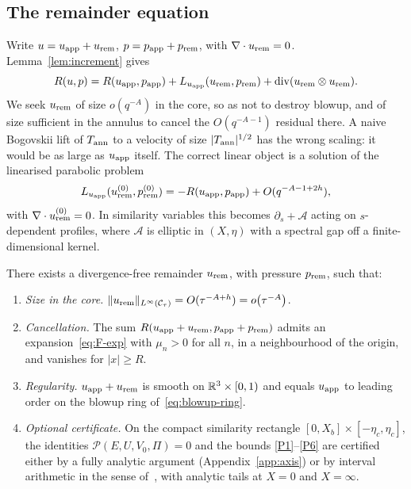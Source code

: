 \subsection{The remainder equation}

Write $u=u_{\mathrm{app}}+u_{\mathrm{rem}}$, $p=p_{\mathrm{app}}+p_{\mathrm{rem}}$, with $\nabla\cdot u_{\mathrm{rem}}=0$. Lemma~\ref{lem:increment} gives
\begin{equation}
\label{eq:rem-eq}
R(u,p)
=R(u_{\mathrm{app}},p_{\mathrm{app}})
+L_{u_{\mathrm{app}}}(u_{\mathrm{rem}},p_{\mathrm{rem}})
+\operatorname{div}(u_{\mathrm{rem}}\otimes u_{\mathrm{rem}}).
\end{equation}
We seek $u_{\mathrm{rem}}$ of size $o(q^{-A})$ in the core, so as not to destroy blowup, and of size sufficient in the annulus to cancel the $O(q^{-A-1})$ residual there. A naive {B}ogovskii lift of $T_{\mathrm{ann}}$ to a velocity of size $|T_{\mathrm{ann}}|^{1/2}$ has the wrong scaling: it would be as large as $u_{\mathrm{app}}$ itself. The correct linear object is a solution of the linearised parabolic problem
\[
L_{u_{\mathrm{app}}}(u_{\mathrm{rem}}^{(0)},p_{\mathrm{rem}}^{(0)})
=-R(u_{\mathrm{app}},p_{\mathrm{app}})+O(q^{-A-1+2h}),
\]
with $\nabla\cdot u_{\mathrm{rem}}^{(0)}=0$. In similarity variables this becomes $\partial_s+\mathcal A$ acting on $s$-dependent profiles, where $\mathcal A$ is elliptic in $(X,\eta)$ with a spectral gap off a finite-dimensional kernel.

\begin{assumption}
\label{ass:profile-control}
There exists a divergence-free remainder $u_{\mathrm{rem}}$, with pressure $p_{\mathrm{rem}}$, such that:
\begin{enumerate}[label=\textup{(B\arabic*)}]
\item \label{B1} \emph{Size in the core.} $\|u_{\mathrm{rem}}\|_{L^\infty(\mathcal C_\tau)}=O(\tau^{-A+h})=o\bigl(\tau^{-A}\bigr)$.
\item \label{B2} \emph{Cancellation.} The sum $R(u_{\mathrm{app}}+u_{\mathrm{rem}},p_{\mathrm{app}}+p_{\mathrm{rem}})$ admits an expansion~\eqref{eq:F-exp} with $\mu_n>0$ for all $n$, in a neighbourhood of the origin, and vanishes for $|x|\ge R$.
\item \label{B3} \emph{Regularity.} $u_{\mathrm{app}}+u_{\mathrm{rem}}$ is smooth on $\mathbb{R}^3\times[0,1)$ and equals $u_{\mathrm{app}}$ to leading order on the blowup ring of~\eqref{eq:blowup-ring}.
\item \label{B4} \emph{Optional certificate.} On the compact similarity rectangle $[0,X_b]\times[-\eta_c,\eta_c]$, the identities $\mathcal P(E,U,V_0,\Pi)=0$ and the bounds \ref{P1}--\ref{P6} are certified either by a fully analytic argument (Appendix~\ref{app:axis}) or by interval arithmetic in the sense of~\cite{anandkumar2026,chenhou2022}, with analytic tails at $X=0$ and $X=\infty$.
\end{enumerate}
\end{assumption}

